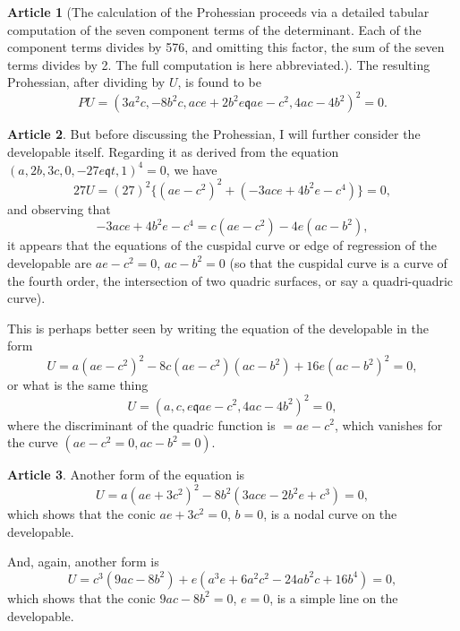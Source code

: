 \documentclass[11pt,a4paper]{article}
\theoremstyle{definition}
\newtheorem{art}{Article}[section]
\begin{document}
\begin{art}
[The calculation of the Prohessian proceeds via a detailed tabular computation
of the seven component terms of the determinant. Each of the component terms
divides by 576, and omitting this factor, the sum of the seven terms divides by 2.
The full computation is here abbreviated.]

The resulting Prohessian, after dividing by $U$, is found to be
\[
PU = (3a^2c, -8b^2c, ace + 2b^2e \mathbin{\mathfrak{q}} ae - c^2, 4ac - 4b^2)^2 = 0.
\]
\end{art}

\setcounter{art}{14}
\begin{art}
But before discussing the Prohessian, I will further consider the developable
itself. Regarding it as derived from the equation $(a, 2b, 3c, 0, -27e \mathbin{\mathfrak{q}} t, 1)^4 = 0$,
we have
\[
27U = (27)^2\{(ae - c^2)^2 + (-3ace + 4b^2e - c^4)\} = 0,
\]
and observing that
\[
-3ace + 4b^2e - c^4 = c(ae - c^2) - 4e(ac - b^2),
\]
it appears that the equations of the cuspidal curve or edge of regression of the
developable are $ae - c^2 = 0$, $ac - b^2 = 0$ (so that the cuspidal curve is a curve of the
fourth order, the intersection of two quadric surfaces, or say a quadri-quadric curve).

This is perhaps better seen by writing the equation of the developable in the form
\[
U = a(ae - c^2)^2 - 8c(ae - c^2)(ac - b^2) + 16e(ac - b^2)^2 = 0,
\]
or what is the same thing
\[
U = (a, c, e \mathbin{\mathfrak{q}} ae - c^2, 4ac - 4b^2)^2 = 0,
\]
where the discriminant of the quadric function is $= ae - c^2$, which vanishes for the
curve $(ae - c^2 = 0, ac - b^2 = 0)$.
\end{art}

\begin{art}
Another form of the equation is
\[
U = a(ae + 3c^2)^2 - 8b^2(3ace - 2b^2e + c^3) = 0,
\]
which shows that the conic $ae + 3c^2 = 0$, $b = 0$, is a nodal curve on the developable.

And, again, another form is
\[
U = c^3(9ac - 8b^2) + e(a^3e + 6a^2c^2 - 24ab^2c + 16b^4) = 0,
\]
which shows that the conic $9ac - 8b^2 = 0$, $e = 0$, is a simple line on the developable.
\end{art}
\end{document}
